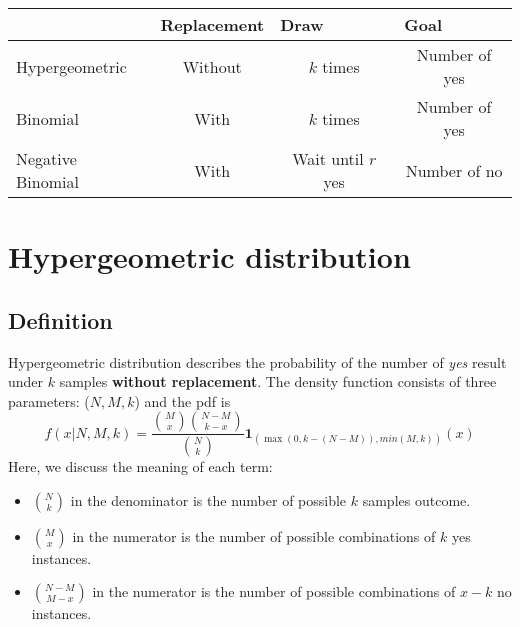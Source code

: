 \documentclass[11pt]{article}
\begin{document}
\begin{table}[h]
	\centering
	\begin{tabular}{|l|c|c|c|}
		\hline
		& \multicolumn{1}{l|}{Replacement} & \multicolumn{1}{l|}{Draw} & \multicolumn{1}{l|}{Goal} \\ \hline
		Hypergeometric    & Without                          & $k$ times                 & Number of yes             \\ \hline
		Binomial          & With                             & $k$ times                 & Number of yes             \\ \hline
		Negative Binomial & With                             & Wait until $r$ yes        & Number of no              \\ \hline
	\end{tabular}
\end{table}

\section{Hypergeometric distribution}
\subsection{Definition}
Hypergeometric distribution describes the probability of the number of {\it yes} result under $k$ samples {\bf without replacement}. The density function consists of three parameters: ($N,M,k$) and the pdf is
$$f(x|N,M,k) = \frac{{M\choose x}{N-M \choose k-x}}{{N\choose k}}\mathbf{1}_{(\max(0,k-(N-M)),min(M,k))}(x)$$
Here, we discuss the meaning of each term:
\begin{itemize}
	\item ${N\choose k}$ in the denominator is the number of possible $k$ samples outcome.
	\item ${M\choose x}$ in the numerator is the number of possible combinations of $k$ yes instances.
	\item ${N-M\choose M-x}$ in the numerator is the number of possible combinations of $x-k$ no instances.
\end{itemize}
\end{document}
